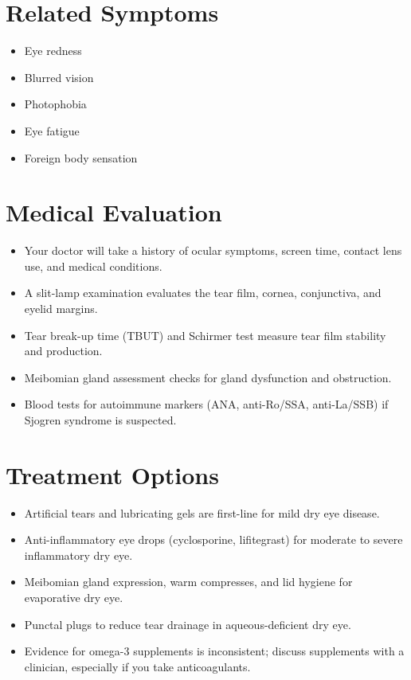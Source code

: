 \section*{Related Symptoms}
\begin{itemize}
  \item Eye redness
  \item Blurred vision
  \item Photophobia
  \item Eye fatigue
  \item Foreign body sensation
\end{itemize}

\section*{Medical Evaluation}
\begin{itemize}
  \item Your doctor will take a history of ocular symptoms, screen time, contact lens use, and medical conditions.
  \item A slit-lamp examination evaluates the tear film, cornea, conjunctiva, and eyelid margins.
  \item Tear break-up time (TBUT) and Schirmer test measure tear film stability and production.
  \item Meibomian gland assessment checks for gland dysfunction and obstruction.
  \item Blood tests for autoimmune markers (ANA, anti-Ro/SSA, anti-La/SSB) if Sjogren syndrome is suspected.
\end{itemize}

\section*{Treatment Options}
\begin{itemize}
  \item Artificial tears and lubricating gels are first-line for mild dry eye disease.
  \item Anti-inflammatory eye drops (cyclosporine, lifitegrast) for moderate to severe inflammatory dry eye.
  \item Meibomian gland expression, warm compresses, and lid hygiene for evaporative dry eye.
  \item Punctal plugs to reduce tear drainage in aqueous-deficient dry eye.
  \item Evidence for omega-3 supplements is inconsistent; discuss supplements with a clinician, especially if you take anticoagulants.
\end{itemize}

